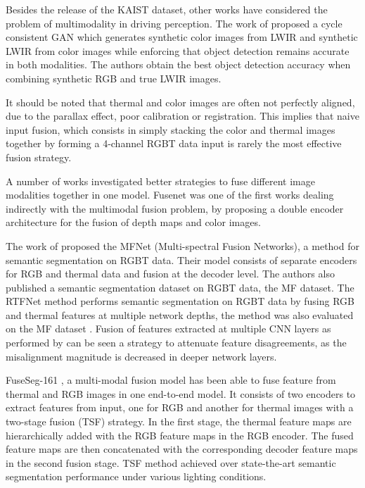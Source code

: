 \documentclass[10pt,twocolumn,letterpaper]{article}
\begin{document}
Besides the release of the KAIST dataset, other works have considered the problem of multimodality in driving perception. The work of \cite{Abbott2020} proposed a cycle consistent GAN which generates synthetic color images from LWIR and synthetic LWIR from color images while enforcing that object detection remains accurate in both modalities. The authors obtain the best object detection accuracy when combining synthetic RGB and true LWIR images.

It should be noted that thermal and color images are often not perfectly aligned, due to the parallax effect, poor calibration or registration.
This implies that naive input fusion, which consists in simply stacking the color and thermal images together by forming a 4-channel RGBT data input is rarely the most effective fusion strategy. 

A number of works investigated better strategies to fuse different image modalities together in one model. Fusenet \cite{DBLP:conf/accv/HazirbasMDC16} was one of the first works dealing indirectly with the multimodal fusion problem, by proposing a double encoder architecture for the fusion of depth maps and color images. 

The work of \cite{Ha2017} proposed the MFNet (Multi-spectral Fusion Networks), a method for semantic segmentation on RGBT data. Their model consists of separate encoders for RGB and thermal data and fusion at the decoder level. The authors also published a semantic segmentation dataset on RGBT data, the MF dataset. The RTFNet method \cite{Sun2019} performs semantic segmentation on RGBT data by fusing RGB and thermal features at multiple network depths, the method was also evaluated on the MF dataset \cite{Ha2017}. Fusion of features extracted at multiple CNN layers as performed by \cite{Sun2019} can be seen a strategy to attenuate feature disagreements, as the misalignment magnitude is decreased in deeper network layers.

FuseSeg-161 \cite{FuseSeg}, a multi-modal fusion model has been able to fuse feature from thermal and RGB images in one end-to-end model. It consists of two encoders to extract features from input, one for RGB and another for thermal images with a two-stage fusion (TSF) strategy. In the first stage, the thermal feature maps are hierarchically added with the RGB feature maps in the RGB encoder. The fused feature maps are then concatenated with the corresponding decoder feature maps in the second fusion stage. TSF method achieved over state-the-art semantic segmentation performance under various lighting conditions.
\end{document}
